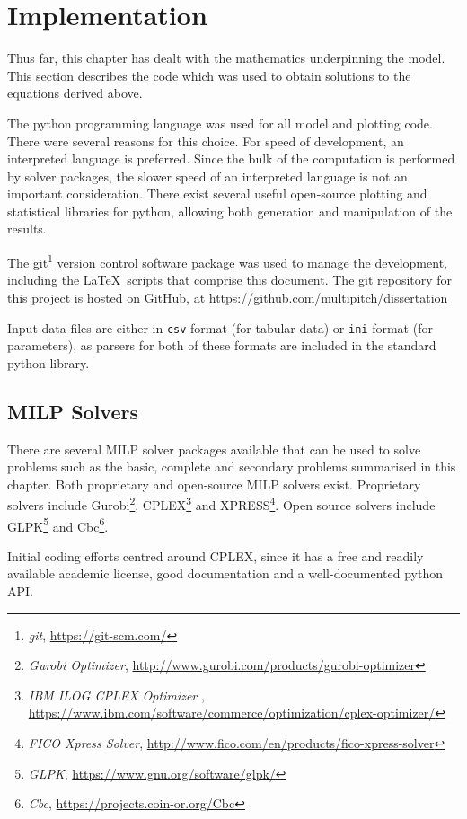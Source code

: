 \section{Implementation}\label{S.implementation}

Thus far, this chapter has dealt with the mathematics underpinning the model.
This section describes the code which was used to obtain solutions to the
equations derived above.

The python programming language was used for all model and plotting code.
There were several reasons for this choice.
For speed of development, an interpreted language is preferred.
Since the bulk of the computation is performed by solver packages, the slower
speed of an interpreted language is not an important consideration.
There exist several useful open-source plotting and statistical libraries for
python, allowing both generation and manipulation of the results.

The git\footnote{\emph{git}, \url{https://git-scm.com/}} version control
software package was used to manage the development, including the \LaTeX\
scripts that comprise this document.
The git repository for this project is hosted on GitHub, at 
\url{https://github.com/multipitch/dissertation}

Input data files are either in \texttt{csv} format (for tabular data) or
\texttt{ini} format (for parameters), as parsers for both of these formats are
included in the standard python library.

\subsection{MILP Solvers}\label{SS.impl1}

There are several MILP solver packages available that can be used to solve
problems such as the basic, complete and secondary problems summarised in this
chapter. Both proprietary and open-source MILP solvers exist.
Proprietary solvers include
Gurobi\footnote{\emph{Gurobi Optimizer},
                \url{http://www.gurobi.com/products/gurobi-optimizer}},
CPLEX\footnote{\emph{IBM ILOG CPLEX Optimizer} ,
    \url{https://www.ibm.com/software/commerce/optimization/cplex-optimizer/}}
and XPRESS\footnote{\emph{FICO Xpress Solver},
    \url{http://www.fico.com/en/products/fico-xpress-solver}}.
Open source solvers include
GLPK\footnote{\emph{GLPK}, \url{https://www.gnu.org/software/glpk/}}
and Cbc\footnote{\emph{Cbc}, \url{https://projects.coin-or.org/Cbc}}.

Initial coding efforts centred around CPLEX, since it has a free and
readily available academic license, good documentation and a well-documented
python API.

